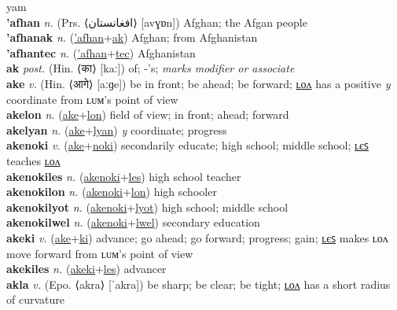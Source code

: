 yam \label{'aflika'yewlasiatulsetupel} \\
\textbf{'afhan} \textit{n.} (Prs. ⟨افغانستان‬⟩ [avɣɒn])
Afghan; the Afgan people \label{'afhan} \\
\textbf{'afhanak} \textit{n.} (\hyperref['afhan]{'afhan}+\hyperref[ak]{ak})
Afghan; from Afghanistan \label{'afhanak} \\
\textbf{'afhantec} \textit{n.} (\hyperref['afhan]{'afhan}+\hyperref[tec]{tec})
Afghanistan \label{'afhantec} \\
\textbf{ak} \textit{post.} (Hin. ⟨का⟩ [kaː])
of; -’s; \textit{marks modifier or associate} \label{ak} \\
\textbf{ake} \textit{v.} (Hin. ⟨आगे⟩ [aːɡe])
be in front; be ahead; be forward; \hyperref[akelon]{ʟᴏᴧ} has a positive \textit{y} coordinate from ʟᴜᴍ’s point of view \label{ake} \\
\textbf{akelon} \textit{n.} (\hyperref[ake]{ake}+\hyperref[lon]{lon})
field of view; in front; ahead; forward \label{akelon} \\
\textbf{akelyan} \textit{n.} (\hyperref[ake]{ake}+\hyperref[lyan]{lyan})
\textit{y} coordinate; progress \label{akelyan} \\
\textbf{akenoki} \textit{v.} (\hyperref[ake]{ake}+\hyperref[noki]{noki})
secondarily educate; high school; middle school; \hyperref[akenokiles]{ʟєꜱ} teaches \hyperref[akenokilon]{ʟᴏᴧ} \label{akenoki} \\
\textbf{akenokiles} \textit{n.} (\hyperref[akenoki]{akenoki}+\hyperref[les]{les})
high school teacher \label{akenokiles} \\
\textbf{akenokilon} \textit{n.} (\hyperref[akenoki]{akenoki}+\hyperref[lon]{lon})
high schooler \label{akenokilon} \\
\textbf{akenokilyot} \textit{n.} (\hyperref[akenoki]{akenoki}+\hyperref[lyot]{lyot})
high school; middle school \label{akenokilyot} \\
\textbf{akenokilwel} \textit{n.} (\hyperref[akenoki]{akenoki}+\hyperref[lwel]{lwel})
secondary education \label{akenokilwel} \\
\textbf{akeki} \textit{v.} (\hyperref[ake]{ake}+\hyperref[ki]{ki})
advance; go ahead; go forward; progress; gain; \hyperref[akekiles]{ʟєꜱ} makes ʟᴏᴧ move forward from ʟᴜᴍ’s point of view \label{akeki} \\
\textbf{akekiles} \textit{n.} (\hyperref[akeki]{akeki}+\hyperref[les]{les})
advancer \label{akekiles} \\
\textbf{akla} \textit{v.} (Epo. ⟨akra⟩ [ˈakra])
be sharp; be clear; be tight; \hyperref[aklalon]{ʟᴏᴧ} has a short radius of curvature \label{akla} \\
